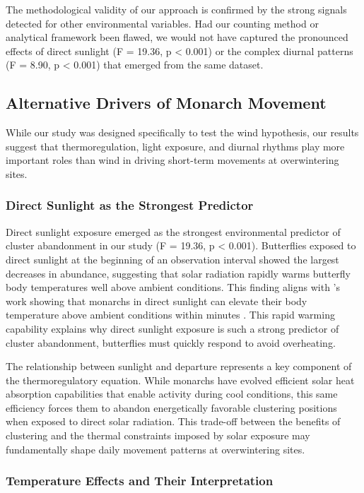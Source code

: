 The methodological validity of our approach is confirmed by the strong signals detected for other environmental variables. Had our counting method or analytical framework been flawed, we would not have captured the pronounced effects of direct sunlight (F = 19.36, p < 0.001) or the complex diurnal patterns (F = 8.90, p < 0.001) that emerged from the same dataset.

\subsection{Alternative Drivers of Monarch Movement}

While our study was designed specifically to test the wind hypothesis, our results suggest that thermoregulation, light exposure, and diurnal rhythms play more important roles than wind in driving short-term movements at overwintering sites.

\subsubsection{Direct Sunlight as the Strongest Predictor}

Direct sunlight exposure emerged as the strongest environmental predictor of cluster abandonment in our study (F = 19.36, p < 0.001). Butterflies exposed to direct sunlight at the beginning of an observation interval showed the largest decreases in abundance, suggesting that solar radiation rapidly warms butterfly body temperatures well above ambient conditions. This finding aligns with \citeauthor{Masters1988_ACNENTPT}'s work showing that monarchs in direct sunlight can elevate their body temperature above ambient conditions within minutes \autocite{Masters1988_ACNENTPT}. This rapid warming capability explains why direct sunlight exposure is such a strong predictor of cluster abandonment, butterflies must quickly respond to avoid overheating.

The relationship between sunlight and departure represents a key component of the thermoregulatory equation. While monarchs have evolved efficient solar heat absorption capabilities that enable activity during cool conditions, this same efficiency forces them to abandon energetically favorable clustering positions when exposed to direct solar radiation. This trade-off between the benefits of clustering and the thermal constraints imposed by solar exposure may fundamentally shape daily movement patterns at overwintering sites.

\subsubsection{Temperature Effects and Their Interpretation}

